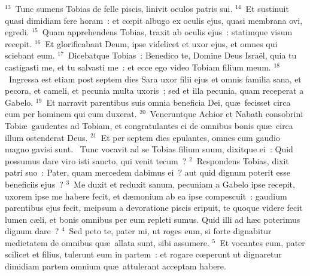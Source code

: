 ${}^{13}$~Tunc sumens Tobias de felle piscis, linivit oculos patris sui.
${}^{14}$~Et sustinuit quasi dimidiam fere horam~: et cœpit albugo ex oculis ejus, quasi membrana ovi, egredi.
${}^{15}$~Quam apprehendens Tobias, traxit ab oculis ejus~: statimque visum recepit.
${}^{16}$~Et glorificabant Deum, ipse videlicet et uxor ejus, et omnes qui sciebant eum.
${}^{17}$~Dicebatque Tobias~: Benedico te, Domine Deus Isra\"el, quia tu castigasti me, et tu salvasti me~: et ecce ego video Tobiam filium meum.
${}^{18}$~Ingressa est etiam post septem dies Sara uxor filii ejus et omnis familia sana, et pecora, et cameli, et pecunia multa uxoris~; sed et illa pecunia, quam receperat a Gabelo.
${}^{19}$~Et narravit parentibus suis omnia beneficia Dei, qu\ae\ fecisset circa eum per hominem qui eum duxerat.
${}^{20}$~Veneruntque Achior et Nabath consobrini Tobi\ae\ gaudentes ad Tobiam, et congratulantes ei de omnibus bonis qu\ae\ circa illum ostenderat Deus.
${}^{21}$~Et per septem dies epulantes, omnes cum gaudio magno gavisi sunt.
~\lettrine[lines=10,image=true,loversize=0.05,lraise=-0.03]{T}{}unc vocavit ad se Tobias filium suum, dixitque ei~: Quid possumus dare viro isti sancto, qui venit tecum~?
${}^{2}$~Respondens Tobias, dixit patri suo~: Pater, quam mercedem dabimus ei~? aut quid dignum poterit esse beneficiis ejus~?
${}^{3}$~Me duxit et reduxit sanum, pecuniam a Gabelo ipse recepit, uxorem ipse me habere fecit, et d\ae monium ab ea ipse compescuit~: gaudium parentibus ejus fecit, meipsum a devoratione piscis eripuit, te quoque videre fecit lumen c\ae li, et bonis omnibus per eum repleti sumus. Quid illi ad h\ae c poterimus dignum dare~?
${}^{4}$~Sed peto te, pater mi, ut roges eum, si forte dignabitur medietatem de omnibus qu\ae\ allata sunt, sibi assumere.
${}^{5}$~Et vocantes eum, pater scilicet et filius, tulerunt eum in partem~: et rogare cœperunt ut dignaretur dimidiam partem omnium qu\ae\ attulerant acceptam habere.


